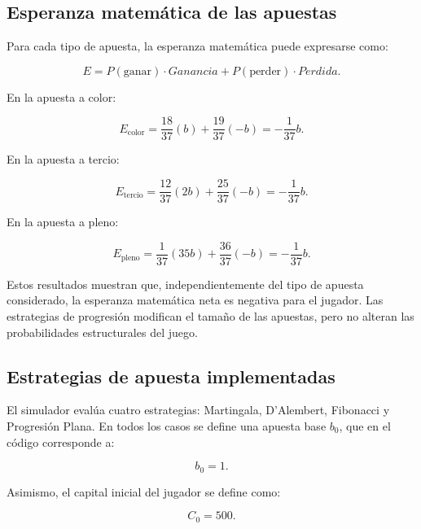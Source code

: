 \documentclass{article}
\begin{document}
\subsection{Esperanza matemática de las apuestas}

Para cada tipo de apuesta, la esperanza matemática puede expresarse como:

\begin{equation}
    E = P(\text{ganar}) \cdot Ganancia + P(\text{perder}) \cdot Perdida.
\end{equation}

En la apuesta a color:

\begin{equation}
    E_{\text{color}}=\frac{18}{37}(b)+\frac{19}{37}(-b)
    =-\frac{1}{37}b.
\end{equation}

En la apuesta a tercio:

\begin{equation}
    E_{\text{tercio}}=\frac{12}{37}(2b)+\frac{25}{37}(-b)
    =-\frac{1}{37}b.
\end{equation}

En la apuesta a pleno:

\begin{equation}
    E_{\text{pleno}}=\frac{1}{37}(35b)+\frac{36}{37}(-b)
    =-\frac{1}{37}b.
\end{equation}

Estos resultados muestran que, independientemente del tipo de apuesta considerado, la esperanza matemática neta es negativa para el jugador. Las estrategias de progresión modifican el tamaño de las apuestas, pero no alteran las probabilidades estructurales del juego.

\subsection{Estrategias de apuesta implementadas}

El simulador evalúa cuatro estrategias: Martingala, D'Alembert, Fibonacci y Progresión Plana. En todos los casos se define una apuesta base $b_0$, que en el código corresponde a:

\begin{equation}
    b_0 = 1.
\end{equation}

Asimismo, el capital inicial del jugador se define como:

\begin{equation}
    C_0 = 500.
\end{equation}
\end{document}
